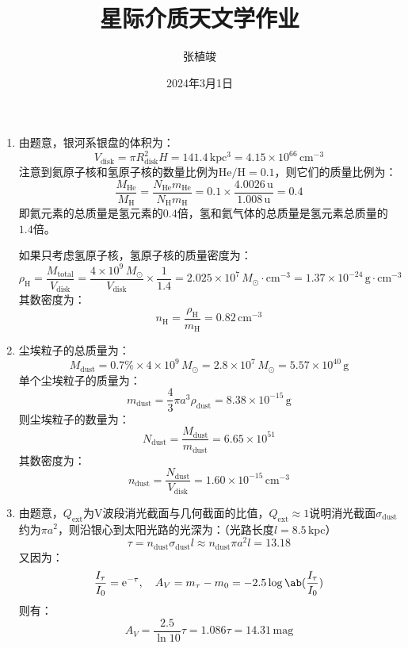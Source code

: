 \documentclass[a4paper,fontset=none]{ctexart}
\title{\textbf{星际介质天文学作业}}
\author{张植竣}
\date{2024年3月1日}
\begin{document}
\maketitle

\begin{enumerate}
    \item[1.1 (a)]
    由题意，银河系银盘的体积为：
    \[
        V_{\mathrm{disk}} = \pi R_{\mathrm{disk}}^2 H = 141.4\,\mathrm{kpc^3} = 4.15 \times 10^{66}\,\mathrm{cm^{-3}}
    \]
    注意到氦原子核和氢原子核的数量比例为$\mathrm{He/H} = 0.1$，则它们的质量比例为：
    \[
        \frac{M_{\mathrm{He}}}{M_{\mathrm{H}}} = \frac{N_{\mathrm{He}} m_{\mathrm{He}}}{N_{\mathrm{H}} m_{\mathrm{H}}} = 0.1 \times \frac{4.0026\,\mathrm{u}}{1.008\,\mathrm{u}} = 0.4
    \]
    即氦元素的总质量是氢元素的$0.4$倍，氢和氦气体的总质量是氢元素总质量的$1.4$倍。

    如果只考虑氢原子核，氢原子核的质量密度为：
    \[
        \rho_{\mathrm{H}} = \frac{M_{\mathrm{total}}}{V_{\mathrm{disk}}} = \frac{4 \times 10^9\,M_\odot}{V_{\mathrm{disk}}} \times \frac{1}{1.4} = 2.025 \times 10^7\,M_\odot \cdot \mathrm{cm^{-3}} = 1.37 \times 10^{-24}\,\mathrm{g \cdot cm^{-3}}
    \]
    其数密度为：
    \[
        n_{\mathrm{H}} = \frac{\rho_{\mathrm{H}}}{m_{\mathrm{H}}} = 0.82\,\mathrm{cm^{-3}}
    \]

    \medskip
    \item[1.1 (b)]
    尘埃粒子的总质量为：
    \[
        M_{\mathrm{dust}} = 0.7\% \times 4 \times 10^9\,M_\odot = 2.8 \times 10^{7}\,M_\odot = 5.57 \times 10^{40}\,\mathrm{g}
    \]
    单个尘埃粒子的质量为：
    \[
        m_{\mathrm{dust}} = \frac{4}{3}\pi a^3 \rho_{\mathrm{dust}} = 8.38 \times 10^{-15}\,\mathrm{g}
    \]
    则尘埃粒子的数量为：
    \[
        N_{\mathrm{dust}} = \frac{M_{\mathrm{dust}}}{m_{\mathrm{dust}}} = 6.65 \times 10^{51}
    \]
    其数密度为：
    \[
        n_{\mathrm{dust}} = \frac{N_{\mathrm{dust}}}{V_{\mathrm{disk}}} = 1.60 \times 10^{-15}\,\mathrm{cm^{-3}}
    \]

    \item[1.1 (c)]
    由题意，$Q_{\mathrm{ext}}$为V波段消光截面与几何截面的比值，$Q_{\mathrm{ext}} \approx 1$说明消光截面$\sigma_{\mathrm{dust}}$约为$\pi a^2$，则沿银心到太阳光路的光深为：（光路长度$l = 8.5\,\mathrm{kpc}$）
    \[
        \tau = n_{\mathrm{dust}}\sigma_{\mathrm{dust}} l \approx n_{\mathrm{dust}} \pi a^2 l = 13.18
    \]
    又因为：
    \[
        \frac{I_\tau}{I_0} = \mathrm{e}^{-\tau},\quad A_V = m_\tau - m_0 = -2.5\log\ab(\frac{I_\tau}{I_0})
    \]
    则有：
    \[
        A_V = \frac{2.5}{\ln{10}}\tau = 1.086\tau = 14.31\,\mathrm{mag}
    \]


\end{enumerate}
\end{document}
